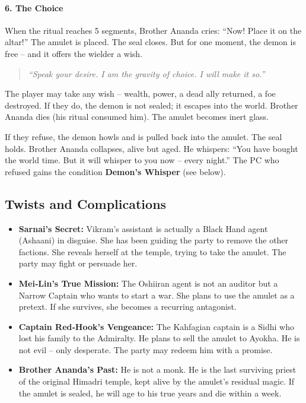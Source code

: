 \documentclass[11pt]{book}
\begin{document}
\paragraph{6. The Choice}
When the ritual reaches 5 segments, Brother Ananda cries: “Now! Place it on the altar!” The amulet is placed. The seal closes. But for one moment, the demon is free – and it offers the wielder a wish.

\begin{quote}
\textit{“Speak your desire. I am the gravity of choice. I will make it so.”}
\end{quote}

The player may take any wish – wealth, power, a dead ally returned, a foe destroyed. If they do, the demon is not sealed; it escapes into the world. Brother Ananda dies (his ritual consumed him). The amulet becomes inert glass.

If they refuse, the demon howls and is pulled back into the amulet. The seal holds. Brother Ananda collapses, alive but aged. He whispers: “You have bought the world time. But it will whisper to you now – every night.” The PC who refused gains the condition \textbf{Demon’s Whisper} (see below).

\subsection{Twists and Complications}

\begin{itemize}
    \item \textbf{Sarnai’s Secret:} Vikram’s assistant is actually a Black Hand agent (Ashaani) in disguise. She has been guiding the party to remove the other factions. She reveals herself at the temple, trying to take the amulet. The party may fight or persuade her.
    \item \textbf{Mei‑Lin’s True Mission:} The Oshiiran agent is not an auditor but a Narrow Captain who wants to start a war. She plans to use the amulet as a pretext. If she survives, she becomes a recurring antagonist.
    \item \textbf{Captain Red‑Hook’s Vengeance:} The Kahfagian captain is a Sidhi who lost his family to the Admiralty. He plans to sell the amulet to Ayokha. He is not evil – only desperate. The party may redeem him with a promise.
    \item \textbf{Brother Ananda’s Past:} He is not a monk. He is the last surviving priest of the original Himadri temple, kept alive by the amulet’s residual magic. If the amulet is sealed, he will age to his true years and die within a week.
\end{itemize}
\end{document}
